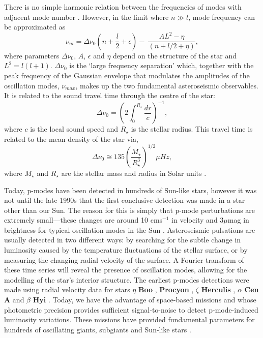 There is no simple harmonic relation between the frequencies of modes with
adjacent mode number \citep{brown}.
However, in the limit where $n \gg l$, mode frequency can be approximated as
\begin{equation}
    \nu_{nl} = \Delta\nu_0\left(n + \frac{l}{2} + \epsilon \right) - \
    \frac{AL^2 - \eta}{(n + l/2 + \eta)},
\end{equation}
where parameters $\Delta\nu_0$, $A$, $\epsilon$ and $\eta$ depend on the
structure of the star and $L^2 = l(l+1)$.
$\Delta\nu_0$ is the `large frequency separation' which, together with the
peak frequency of the Gaussian envelope that modulates the amplitudes of the
oscillation modes, $\nu_{max}$, makes up the two fundamental asteroseismic
observables.
It is related to the sound travel time through the centre of the star:
\begin{equation}
\Delta\nu_0 = \left(2\int_0^{R_\star}\frac{dr}{c}\right)^{-1},
\end{equation}
where $c$ is the local sound speed and $R_\star$ is the stellar radius.
This travel time is related to the mean density of the star via,
\begin{equation}
\Delta\nu_0 \cong 135\left(\frac{M_\star}{R_\star^3}\right)^{1/2}\mu Hz,
\end{equation}
where $M_\star$ and $R_\star$ are the stellar mass and radius in Solar units
\citep{cox, brown}.

Today, p-modes have been detected in hundreds of Sun-like stars, however it
was not until the late 1990s that the first conclusive detection was made in
a star other than our Sun.
The reason for this is simply that p-mode perturbations are extremely
small---these changes are around 10 cms$^{-1}$ in velocity and 3$\mu$mag in
brightness for typical oscillation modes in the Sun \citep{brown2000}.
Asteroseismic pulsations are usually detected in two different ways: by
searching for the subtle change in luminosity caused by the temperature
fluctuations of the stellar surface, or by measuring the changing radial
velocity of the surface.
A Fourier transform of these time series will reveal the presence of
oscillation modes, allowing for the modelling of the star's interior
structure.
The earliest p-modes detections were made using radial velocity data
\citep{kjeldsen2001} for stars $\eta$ {\bf Boo} \citep{kjeldsen1995}, {\bf
Procyon} \citep{barban1999, martic1999}, $\zeta$ {\bf Herculis}
\citep{martic2001}, $\alpha$ {\bf Cen A} \citep{kjeldsen1999} and $\beta$ {\bf
Hyi} \citep{bedding2001}.
Today, we have the advantage of space-based missions \kepler and \corot whose
photometric precision provides sufficient signal-to-noise to detect
p-mode-induced luminosity variations.
These missions have provided fundamental parameters for hundreds of
oscillating giants, subgiants and Sun-like stars \citep[e.g.][]{michel2008,
bruntt2009, chaplin2014}.

